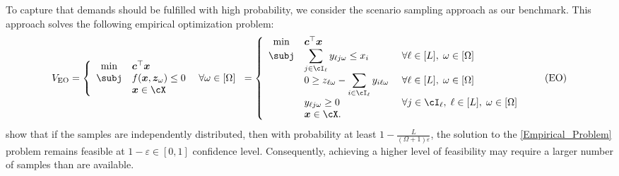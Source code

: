 \documentclass[opre, blindrev]{informs4}
\newcommand{\1}[1]{\mathds{1}{\left(#1\right)}}
\begin{document}
To capture that demands should be fulfilled with high probability, we consider the scenario sampling approach \citep{calafiore2005uncertain} as our benchmark. This approach solves the following empirical optimization problem:
\begin{equation} 
\label{Empirical_Problem}
V_{\mathrm{EO}} = \left\{
\begin{array}{cll}
\min & \bm c^\top \bm x \\
     \subj 
     & \displaystyle f(\bm x,\bm z_\omega)  \leq 0 &~\forall \omega \in [\Omega] \\
     & \displaystyle  {\bm x} \in \cX
\end{array} \right.
= \left\{
\begin{array}{cll}
\min &  \bm c^\top \bm x \\
     \subj 
     & \displaystyle \sum_{j \in \cI_\ell} y_{\ell j\omega} \leq x_i &~\forall \ell \in [L], \; \omega \in [\Omega]\\
     & \displaystyle 0\geq z_{\ell \omega} - \sum_{i \in \cI_{\ell}} y_{i \ell \omega} &~\forall \ell \in [L], \; \omega \in [\Omega] \\
     & \displaystyle y_{\ell j\omega} \geq 0 &~\forall  j \in \cI_{\ell}, \; \ell \in [L], \; \omega \in [\Omega] \\ 
     &  {\bm x} \in \cX.
\end{array} \right.
\tag{EO}
\end{equation}
\cite{calafiore2005uncertain} show that if the samples are independently distributed, then with probability at least $1 - \frac{L}{(\Omega + 1)\varepsilon}$, the solution to the \ref{Empirical_Problem} problem remains feasible at $1-\varepsilon \in [0,1]$ confidence level. Consequently, achieving a higher level of feasibility may require a larger number of samples than are available.
\end{document}
